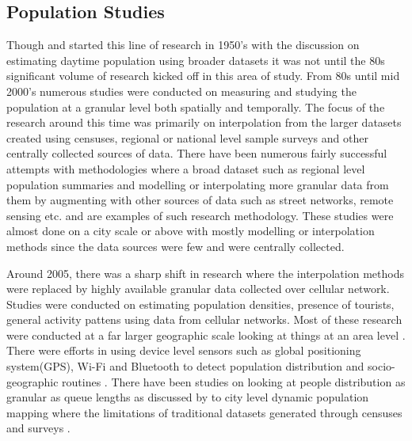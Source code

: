 \subsection{Population Studies}
Though \citet{foley1954} and \citet{schmitt1956} started this line of research in 1950's with the discussion on estimating daytime population using broader datasets it was not until the 80s significant volume of research kicked off in this area of study.
From 80s until mid 2000's numerous studies were conducted on measuring and studying the population at a granular level both spatially and temporally.
The focus of the research around this time was primarily on interpolation from the larger datasets created using censuses, regional or national level sample surveys and other centrally collected sources of data.
There have been numerous fairly successful attempts with methodologies where a broad dataset such  as regional level population summaries and modelling or interpolating more granular data from them by augmenting with other sources of data such as street networks\cite[-10cm]{reibel2005}, remote sensing\cite[-6.5cm]{sutton1997} \cite[-3.5cm]{yuan1997} \cite{chen2002} etc.
\citet{dobson2000, dobson2003a, bhaduri2002, bhaduri2007} and \citep{mennis2003, mennis2006} are examples of such research methodology.
These studies were almost done on a city scale or above with mostly modelling or interpolation methods since the data sources were few and were centrally collected.

Around 2005, there was a sharp shift in research where the interpolation methods were replaced by highly available granular data collected over cellular network.
Studies were conducted on estimating population densities, presence of tourists, general activity pattens using data from cellular networks.
Most of these research were conducted at a far larger geographic scale looking at things at an area level \citep{pulselli2008,girardin2009,phithakkitnukoon2010,yuan2016}.
There were efforts in using device level sensors such as global positioning system(GPS), Wi-Fi and Bluetooth to detect population distribution and socio-geographic routines \citep{calabrese2010,rose2010,farrahi2010}.
There have been studies on looking at people distribution as granular as queue lengths as discussed by \citet{wang2013} to city level dynamic population mapping where the limitations of traditional datasets generated through censuses and surveys \cite[-4cm]{deville2014}.

